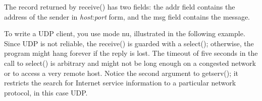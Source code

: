 
The record returned by \textsf{receive()} has two fields: the
\textsf{addr} field contains the address of the sender in
\textsf{{\textquotedbl}}\textsf{\textit{host}}\textsf{:}\textsf{\textit{port}}\textsf{{\textquotedbl}}
form, and the \textsf{msg} field contains the message.

To write a UDP client, you use mode
\textsf{{\textquotedbl}nu{\textquotedbl}}, illustrated in the following
example. Since UDP is not reliable, the \textsf{receive()} is guarded
with a \textsf{select()}; otherwise, the program might hang forever if
the reply is lost. The timeout of five seconds in the call to
\textsf{select()} is arbitrary and might not be long enough on a
congested network or to access a very remote host. Notice the second
argument to \textsf{getserv()}; it restricts the search for Internet
service information to a particular network protocol, in this case UDP.


